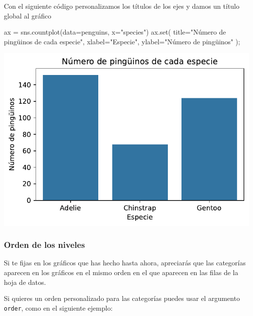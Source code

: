 \documentclass[
  a4paper,
  noprof,
  12pt,
  notoc,
  nosols,
  nobib]{mnye}
\newenvironment{Shaded}{\begin{snugshade}}{\end{snugshade}}
\newcommand{\BuiltInTok}[1]{\textcolor[rgb]{0.00,0.23,0.31}{#1}}
\newcommand{\NormalTok}[1]{\textcolor[rgb]{0.00,0.23,0.31}{#1}}
\newcommand{\OperatorTok}[1]{\textcolor[rgb]{0.37,0.37,0.37}{#1}}
\newcommand{\StringTok}[1]{\textcolor[rgb]{0.13,0.47,0.30}{#1}}
\theoremstyle{definition}
\theoremstyle{remark}
\begin{document}
Con el siguiente código personalizamos los títulos de los ejes y damos
un título global al gráfico

\begin{Shaded}
\begin{Highlighting}[]
\NormalTok{ax }\OperatorTok{=}\NormalTok{ sns.countplot(data}\OperatorTok{=}\NormalTok{penguins, x}\OperatorTok{=}\StringTok{"species"}\NormalTok{)}
\NormalTok{ax.}\BuiltInTok{set}\NormalTok{(}
\NormalTok{    title}\OperatorTok{=}\StringTok{"Número de pingüinos de cada especie"}\NormalTok{,}
\NormalTok{    xlabel}\OperatorTok{=}\StringTok{"Especie"}\NormalTok{, }
\NormalTok{    ylabel}\OperatorTok{=}\StringTok{"Número de pingüinos"}
\NormalTok{)}\OperatorTok{;}
\end{Highlighting}
\end{Shaded}

\begin{center}
\includegraphics{chapters/1categorical_files/figure-pdf/cell-12-output-1.pdf}
\end{center}

\subsubsection{Orden de los niveles}\label{orden-de-los-niveles}

Si te fijas en los gráficos que has hecho hasta ahora, apreciarás que
las categorías aparecen en los gráficos en el mismo orden en el que
aparecen en las filas de la hoja de datos.

Si quieres un orden personalizado para las categorías puedes usar el
argumento \texttt{order}, como en el siguiente ejemplo:
\end{document}
